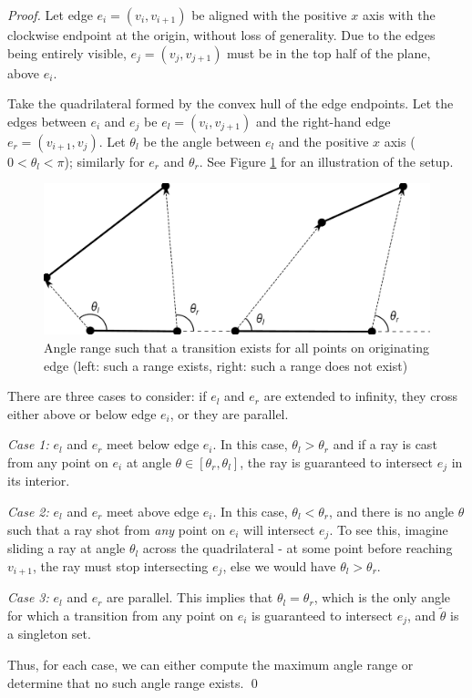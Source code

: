 \documentclass[]{article}
\begin{document}
\begin{proof}

Let edge $e_i = (v_i, v_{i+1})$ be aligned with the positive $x$ axis with the clockwise
endpoint at the origin, without loss of generality. 
Due to the edges being
entirely visible, $e_j = (v_j, v_{j+1})$ must be in the top half of the plane, above
$e_i$.

Take the quadrilateral formed by the convex hull of the edge endpoints.
Let the edges between $e_i$ and $e_j$ be $e_l = (v_i, v_{j+1})$ and the right-hand edge 
$e_r = (v_{i+1}, v_j)$. Let $\theta_{l}$ be
the angle between $e_l$ and the positive $x$ axis ($0 < \theta_l < \pi$); similarly
for $e_r$ and $\theta_r$. See Figure \ref{fig:bounce_range} for an illustration of
the setup. 

\begin{figure}
    \centering
    \includegraphics[width=0.7\linewidth]{figures/bouncerange_min.pdf}
    \caption{Angle range such that a transition exists for all points on
originating edge (left: such a range exists, right: such a range does not
exist)}
\label{fig:bounce_range}
\end{figure}


There are three cases to consider: if $e_l$ and $e_r$ are extended to infinity,
they cross either above or below edge $e_i$, or they are parallel.

\emph{Case 1:} $e_l$ and $e_r$ meet below edge $e_i$. In this case,
$\theta_l > \theta_r$ and if a ray is cast from any point on $e_i$ at angle
$\theta \in [\theta_r, \theta_l]$, the ray is guaranteed to intersect $e_j$ in its
interior.

\emph{Case 2:} $e_l$ and $e_r$ meet above edge $e_i$. In this case, $\theta_l <
\theta_r$, and there is no angle
$\theta$ such that a ray shot from \emph{any} point on $e_i$ will intersect
$e_j$.
To see this, imagine sliding a ray at angle $\theta_l$ across the quadrilateral
- at some point before reaching $v_{i+1}$, the ray must stop intersecting $e_j$,
else we would have $\theta_l > \theta_r$.

\emph{Case 3:} $e_l$ and $e_r$ are parallel. This implies that $\theta_{l} =
\theta_{r}$, which is the only angle for which a transition from any
point on $e_i$ is guaranteed to intersect $e_j$, and $\tilde{\theta}$ is a
singleton set.

Thus, for each case, we can either compute the maximum angle range or determine
that no such angle range exists.
\qed

\end{proof}
\end{document}
